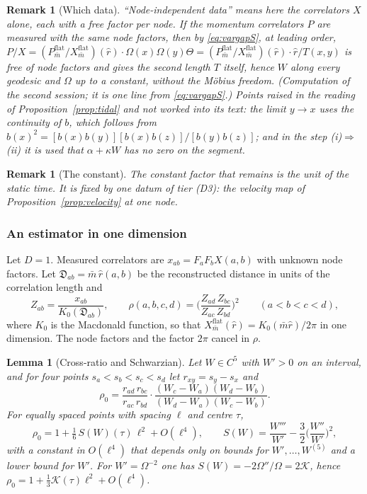 \documentclass[11pt,a4paper]{article}
\theoremstyle{stmt}
\newtheorem{lemma}[theorem]{Lemma}
\theoremstyle{defn}
\theoremstyle{rmk}
\newtheorem{remark}[theorem]{Remark}
\numberwithin{equation}{section}
\begin{document}
{\begin{remark}[Which data]\label{rem:whichdata}
``Node-independent data'' means here the correlators $X$ alone, each with a free factor per node. If the momentum correlators $P$ are measured with the same node factors, then by \eqref{eq:vargapS}, at leading order, $P/X=(P^{\mathrm{flat}}_{\bar m}/X^{\mathrm{flat}}_{\bar m})(\hat r)\cdot\Omega(x)\Omega(y)\Theta=(P^{\mathrm{flat}}_{\bar m}/X^{\mathrm{flat}}_{\bar m})(\hat r)\cdot\hat r/T(x,y)$ is free of node factors and gives the second length $T$ itself, hence $W$ along every geodesic and $\Omega$ up to a constant, without the M\"obius freedom. (Computation of the second session; it is one line from \eqref{eq:vargapS}.) Points raised in the reading of Proposition~\ref{prop:tidal} and not worked into its text: the limit $y\to x$ uses the continuity of $b$, which follows from $b(x)^2=[b(x)b(y)][b(x)b(z)]/[b(y)b(z)]$; and in the step (i)$\Rightarrow$(ii) it is used that $\alpha+\kappa W$ has no zero on the segment.
\end{remark}

\begin{remark}[The constant]
The constant factor that remains is the unit of the static time. It is fixed by one datum of tier \textup{(D3)}: the velocity map of Proposition~\ref{prop:velocity} at one node.
\end{remark}

\subsubsection{An estimator in one dimension}

Let $D=1$. Measured correlators are $x_{ab}=F_aF_bX(a,b)$ with unknown node factors. Let $\mathfrak D_{ab}=\bar m\,\hat r(a,b)$ be the reconstructed distance in units of the correlation length and
\[
Z_{ab}=\frac{x_{ab}}{K_0(\mathfrak D_{ab})},\qquad
\rho(a,b,c,d)=\Big(\frac{Z_{ad}\,Z_{bc}}{Z_{ac}\,Z_{bd}}\Big)^2\qquad(a<b<c<d),
\]
where $K_0$ is the Macdonald function, so that $X^{\mathrm{flat}}_{\bar m}(\hat r)=K_0(\bar m\hat r)/2\pi$ in one dimension. The node factors and the factor $2\pi$ cancel in $\rho$.

\begin{lemma}[Cross-ratio and Schwarzian]\label{lem:schwarz}
Let $W\in C^5$ with $W'>0$ on an interval, and for four points $s_a<s_b<s_c<s_d$ let $r_{xy}=s_y-s_x$ and
\[
\rho_0=\frac{r_{ad}\,r_{bc}}{r_{ac}\,r_{bd}}\cdot\frac{(W_c-W_a)(W_d-W_b)}{(W_d-W_a)(W_c-W_b)} .
\]
For equally spaced points with spacing $\ell$ and centre $\tau$,
\[
\rho_0=1+\tfrac16\,S(W)(\tau)\,\ell^2+O(\ell^4),\qquad S(W)=\frac{W'''}{W'}-\frac32\Big(\frac{W''}{W'}\Big)^2 ,
\]
with a constant in $O(\ell^4)$ that depends only on bounds for $W',\dots,W^{(5)}$ and a lower bound for $W'$. For $W'=\Omega^{-2}$ one has $S(W)=-2\Omega''/\Omega=2\mathcal K$, hence $\rho_0=1+\tfrac13\mathcal K(\tau)\ell^2+O(\ell^4)$.
\end{lemma}

}
\end{document}
